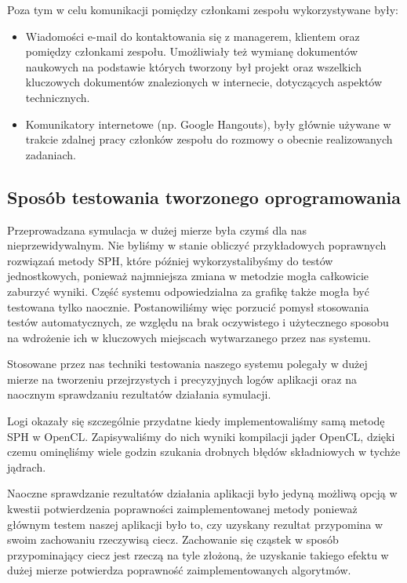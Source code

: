\documentclass[polish, 12pt]{aghthesis}
\begin{document}
		Poza tym w celu komunikacji pomiędzy członkami zespołu wykorzystywane były:
		
		\begin{itemize}
		
			\item Wiadomości e-mail do kontaktowania się z managerem, klientem oraz pomiędzy członkami zespołu. Umożliwiały też wymianę dokumentów naukowych na podstawie których tworzony był projekt oraz wszelkich kluczowych dokumentów znalezionych w internecie, dotyczących aspektów technicznych.
			
			\item Komunikatory internetowe (np. Google Hangouts), były głównie używane w trakcie zdalnej pracy członków zespołu do rozmowy o obecnie realizowanych zadaniach.
		
		\end{itemize}
	
	\subsection{Sposób testowania tworzonego oprogramowania}
	
	Przeprowadzana symulacja w dużej mierze była czymś dla nas nieprzewidywalnym. Nie byliśmy w stanie obliczyć przykładowych poprawnych rozwiązań metody SPH, które później wykorzystalibyśmy do testów jednostkowych, ponieważ najmniejsza zmiana w metodzie mogła całkowicie zaburzyć wyniki. Część systemu odpowiedzialna za grafikę także mogła być testowana tylko naocznie. Postanowiliśmy więc porzucić pomysł stosowania testów automatycznych, ze względu na brak oczywistego i użytecznego sposobu na wdrożenie ich w kluczowych miejscach wytwarzanego przez nas systemu.
	 
	 Stosowane przez nas techniki testowania naszego systemu polegały w dużej mierze na tworzeniu przejrzystych i precyzyjnych logów aplikacji oraz na naocznym sprawdzaniu rezultatów działania symulacji. 
	 
	 Logi okazały się szczególnie przydatne kiedy implementowaliśmy samą metodę SPH w OpenCL. Zapisywaliśmy do nich wyniki kompilacji jąder OpenCL, dzięki czemu ominęliśmy wiele godzin szukania drobnych błędów składniowych w tychże jądrach. 
	 
	 Naoczne sprawdzanie rezultatów działania aplikacji było jedyną możliwą opcją w kwestii potwierdzenia poprawności zaimplementowanej metody ponieważ głównym testem naszej aplikacji było to, czy uzyskany rezultat przypomina w swoim zachowaniu rzeczywisą ciecz. Zachowanie się cząstek w sposób przypominający ciecz jest rzeczą na tyle złożoną, że uzyskanie takiego efektu w dużej mierze potwierdza poprawność zaimplementowanych algorytmów. 
	 
\end{document}
